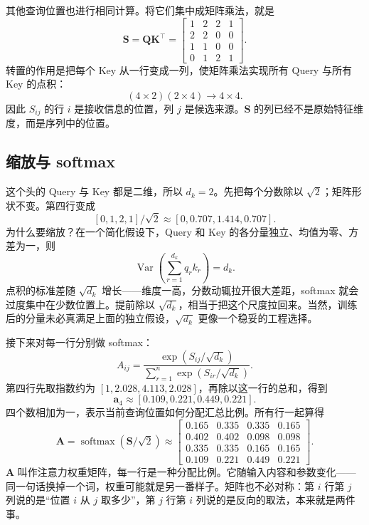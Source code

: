 \documentclass[UTF8,a4paper,12pt]{ctexart}
\numberwithin{equation}{section}
\DeclareMathOperator{\softmax}{softmax}
\begin{document}
其他查询位置也进行相同计算。将它们集中成矩阵乘法，就是
\begin{equation}
\bm S=\bm Q\bm K^\top
=\begin{bmatrix}
1&2&2&1\\
2&2&0&0\\
1&1&0&0\\
0&1&2&1
\end{bmatrix}.
\label{eq:scorematrix}
\end{equation}
转置的作用是把每个 Key 从一行变成一列，使矩阵乘法实现所有 Query 与所有 Key 的点积：
\[
(4\times2)(2\times4)\longrightarrow4\times4.
\]
因此 $S_{ij}$ 的行 $i$ 是接收信息的位置，列 $j$ 是候选来源。$\bm S$ 的列已经不是原始特征维度，而是序列中的位置。

\subsection{缩放与 softmax}

这个头的 Query 与 Key 都是二维，所以 $d_k=2$。先把每个分数除以 $\sqrt2$；矩阵形状不变。第四行变成
\[
[0,1,2,1]/\sqrt2\approx[0,0.707,1.414,0.707].
\]
为什么要缩放？在一个简化假设下，Query 和 Key 的各分量独立、均值为零、方差为一，则
\begin{equation}
\operatorname{Var}\!\left(\sum_{r=1}^{d_k}q_rk_r\right)=d_k.
\label{eq:variance}
\end{equation}
点积的标准差随 $\sqrt{d_k}$ 增长——维度一高，分数动辄拉开很大差距，softmax 就会过度集中在少数位置上。提前除以 $\sqrt{d_k}$，相当于把这个尺度拉回来。当然，训练后的分量未必真满足上面的独立假设，$\sqrt{d_k}$ 更像一个稳妥的工程选择。

接下来对每一行分别做 softmax：
\begin{equation}
A_{ij}=\frac{\exp(S_{ij}/\sqrt{d_k})}
{\sum_{r=1}^{n}\exp(S_{ir}/\sqrt{d_k})}.
\label{eq:rowsoftmax}
\end{equation}
第四行先取指数约为 $[1,2.028,4.113,2.028]$，再除以这一行的总和，得到
\begin{equation}
\bm a_4\approx[0.109,0.221,0.449,0.221].
\label{eq:fourthweights}
\end{equation}
四个数相加为一，表示当前查询位置如何分配汇总比例。所有行一起算得
\begin{equation}
\bm A=\softmax(\bm S/\sqrt2)
\approx\begin{bmatrix}
0.165&0.335&0.335&0.165\\
0.402&0.402&0.098&0.098\\
0.335&0.335&0.165&0.165\\
0.109&0.221&0.449&0.221
\end{bmatrix}.
\label{eq:attentionmatrix}
\end{equation}
$\bm A$ 叫作注意力权重矩阵，每一行是一种分配比例。它随输入内容和参数变化——同一句话换掉一个词，权重可能就是另一番样子。矩阵也不必对称：第 $i$ 行第 $j$ 列说的是``位置 $i$ 从 $j$ 取多少''，第 $j$ 行第 $i$ 列说的是反向的取法，本来就是两件事。
\end{document}
